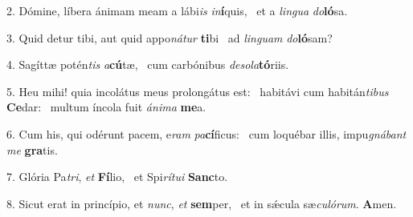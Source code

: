 2. Dómine, líbera ánimam meam a lábi\textit{is} \textit{in}\textbf{í}quis, \ast\  et a \textit{lin}\textit{gua} \textit{do}\textbf{ló}sa.\

3. Quid detur tibi, aut quid appo\textit{ná}\textit{tur} \textbf{ti}bi \ast\  ad \textit{lin}\textit{guam} \textit{do}\textbf{ló}sam?\

4. Sagíttæ potén\textit{tis} \textit{a}\textbf{cú}tæ, \ast\  cum carbónibus \textit{de}\textit{so}\textit{la}\textbf{tó}riis.\

5. Heu mihi! quia incolátus meus prolongátus est: \dag\  habitávi cum habitán\textit{ti}\textit{bus} \textbf{Ce}dar: \ast\  multum íncola fuit \textit{á}\textit{ni}\textit{ma} \textbf{me}a.\

6. Cum his, qui odérunt pacem, e\textit{ram} \textit{pa}\textbf{cí}ficus: \ast\  cum loquébar illis, impu\textit{gná}\textit{bant} \textit{me} \textbf{gra}tis.\

7. Glória Pa\textit{tri}, \textit{et} \textbf{Fí}lio, \ast\  et Spi\textit{rí}\textit{tu}\textit{i} \textbf{Sanc}to.\

8. Sicut erat in princípio, et \textit{nunc}, \textit{et} \textbf{sem}per, \ast\  et in sǽcula sæ\textit{cu}\textit{ló}\textit{rum}. \textbf{A}men.\

